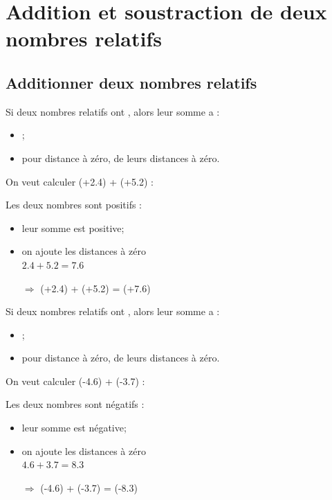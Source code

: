 \documentclass[xcolor={dvipsnames}]{beamer}
\begin{document}
\section{Addition et soustraction de deux nombres relatifs}

\subsection{Additionner deux nombres relatifs}

\begin{frame}
	\begin{myprop}
		Si deux nombres relatifs ont , alors leur somme a :\pause
		\begin{itemize}
			\item {};\pause
			\item pour distance à zéro, \pause {} de leurs distances à zéro.\pause
		\end{itemize}
	\end{myprop}


	\begin{myex}
		On veut calculer (+\num{2.4}) + (+\num{5.2}) : \pause
		
		Les deux nombres sont positifs :
		\begin{itemize}
			\item leur somme est positive;
			\item on ajoute les distances à zéro \\ $\num{2.4} + \num{5.2} = \num{7.6}$ 
			\item[$\Rightarrow$] (+\num{2.4}) + (+\num{5.2}) = (+\num{7.6})
		\end{itemize}
	\end{myex}
\end{frame}


\begin{frame}
	\begin{myprop}
		Si deux nombres relatifs ont , alors leur somme a :
		\begin{itemize}
			\item \kword{le même signe};
			\item pour distance à zéro,   de leurs distances à zéro. 
		\end{itemize}
	\end{myprop}
	
	
	\begin{myex}
		On veut calculer (-\num{4.6}) + (-\num{3.7}) :
		
		Les deux nombres sont négatifs :\pause
		\begin{itemize}
			\item leur somme est négative;\pause
			\item on ajoute les distances à zéro \\ $\num{4.6} + \num{3.7} = \num{8.3}$ \pause
			\item[$\Rightarrow$] (-\num{4.6}) + (-\num{3.7}) = \pause (-\num{8.3})
		\end{itemize}
	\end{myex}
\end{frame}
\end{document}
